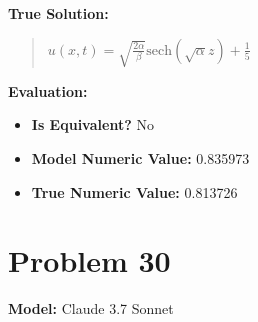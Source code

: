 \documentclass{article}
\begin{document}
\textbf{True Solution:}
\begin{quote}
$u(x,t) = \sqrt{\frac{2 \alpha}{\beta}}\text{sech}(\sqrt{\alpha} z) + \frac{1}{5}$
\end{quote}

\textbf{Evaluation:}
\begin{itemize}
\item \textbf{Is Equivalent?} No
\item \textbf{Model Numeric Value:} 0.835973
\item \textbf{True Numeric Value:} 0.813726
\end{itemize}
\vspace{1cm}
\section*{Problem 30}
\textbf{Model:} Claude 3.7 Sonnet
\end{document}
